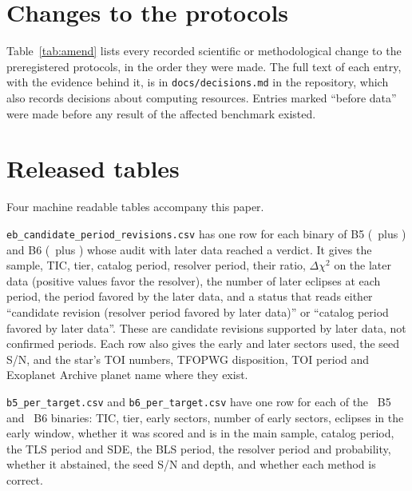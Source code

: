 \documentclass[twocolumn,linenumbers]{aastex701}
\begin{document}

\appendix

\section{Changes to the protocols} \label{app:amend}

Table~\ref{tab:amend} lists every recorded scientific or methodological change to the preregistered protocols, in the order they were made. The full text of each entry, with the evidence behind it, is in \texttt{docs/decisions.md} in the repository, which also records decisions about computing resources. Entries marked ``before data'' were made before any result of the affected benchmark existed.



\section{Released tables} \label{app:data}

Four machine readable tables accompany this paper.

\texttt{eb\_candidate\_period\_revisions.csv} has one row for each binary of B5 (\auditVtwo\ plus \auditCat) and B6 (\bSixAuditRes\ plus \bSixAuditCat) whose audit with later data reached a verdict. It gives the sample, TIC, tier, catalog period, resolver period, their ratio, $\Delta\chi^2$ on the later data (positive values favor the resolver), the number of later eclipses at each period, the period favored by the later data, and a status that reads either ``candidate revision (resolver period favored by later data)'' or ``catalog period favored by later data''. These are candidate revisions supported by later data, not confirmed periods. Each row also gives the early and later sectors used, the seed S/N, and the star's TOI numbers, TFOPWG disposition, TOI period and Exoplanet Archive planet name where they exist.

\texttt{b5\_per\_target.csv} and \texttt{b6\_per\_target.csv} have one row for each of the \bFiveIncluded\ B5 and \bSixIncluded\ B6 binaries: TIC, tier, early sectors, number of early sectors, eclipses in the early window, whether it was scored and is in the main sample, catalog period, the TLS period and SDE, the BLS period, the resolver period and probability, whether it abstained, the seed S/N and depth, and whether each method is correct.
\end{document}
